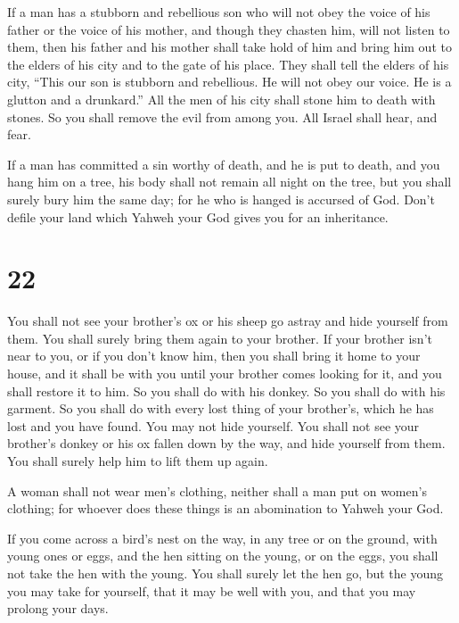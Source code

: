  If a man has a stubborn and rebellious son who will not
obey the voice of his father or the voice of his mother, and though they
chasten him, will not listen to them,  then his father
and his mother shall take hold of him and bring him out to the elders of
his city and to the gate of his place.  They shall tell
the elders of his city, ``This our son is stubborn and rebellious. He
will not obey our voice. He is a glutton and a drunkard.''
 All the men of his city shall stone him to death with
stones. So you shall remove the evil from among you. All Israel shall
hear, and fear.

 If a man has committed a sin worthy of death, and he is
put to death, and you hang him on a tree,  his body shall
not remain all night on the tree, but you shall surely bury him the same
day; for he who is hanged is accursed of God. Don't defile your land
which Yahweh your God gives you for an inheritance.

\hypertarget{section-21}{%
\section{22}\label{section-21}}

 You shall not see your brother's ox or his sheep go
astray and hide yourself from them. You shall surely bring them again to
your brother.  If your brother isn't near to you, or if
you don't know him, then you shall bring it home to your house, and it
shall be with you until your brother comes looking for it, and you shall
restore it to him.  So you shall do with his donkey. So
you shall do with his garment. So you shall do with every lost thing of
your brother's, which he has lost and you have found. You may not hide
yourself.  You shall not see your brother's donkey or his
ox fallen down by the way, and hide yourself from them. You shall surely
help him to lift them up again.

 A woman shall not wear men's clothing, neither shall a
man put on women's clothing; for whoever does these things is an
abomination to Yahweh your God.

 If you come across a bird's nest on the way, in any tree
or on the ground, with young ones or eggs, and the hen sitting on the
young, or on the eggs, you shall not take the hen with the young.
 You shall surely let the hen go, but the young you may
take for yourself, that it may be well with you, and that you may
prolong your days.

